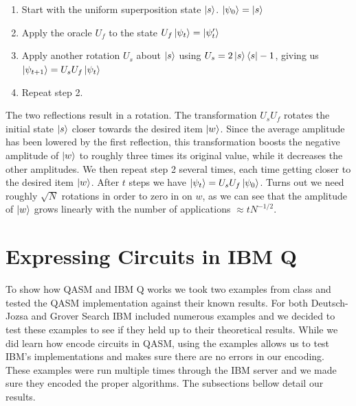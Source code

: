 \documentclass[12pt]{article}
\begin{document}
    \smallskip
    
    \begin{enumerate}
        \item  Start with the uniform superposition state $\ket{s}$. $\ket{\psi_0} = \ket{s}$
        \item Apply the oracle $U_f$ to the state $U_f \ket{\psi_t} = \ket{\psi_t'}$
        \item Apply another rotation $U_s$ about $\ket{s}$ using $U_s = 2\ket{s}\bra{s}-1$, giving us $\ket{\psi_{t+1}} = U_{s}U_{f}\ket{\psi_t}$
        \item Repeat step 2.
    \end{enumerate}
    \noindent
    The two reflections result in a rotation. The transformation $U_{s}U_f$ rotates the initial state $\ket{s}$ closer towards the desired item $\ket{w}$. Since the average amplitude has been lowered by the first reflection, this transformation boosts the negative amplitude of $\ket{w}$ to roughly three times its original value, while it decreases the other amplitudes. We then repeat step 2 several times, each time getting closer to the desired item $\ket{w}$. After $t$ steps we have $\ket{\psi_t} = U_{s}U_{f} \ket{\psi_0}$. Turns out we need roughly $\sqrt{N}$ rotations in order to zero in on $w$, as we can see that the amplitude of $\ket{w}$ grows linearly with the number of applications $\approx tN^{-1/2}$.
    
    
    
        
\section{Expressing Circuits in IBM Q}
    To show how QASM and IBM Q works we took two examples from class and tested the QASM implementation against their known results. For both Deutsch-Jozsa and Grover Search IBM included numerous examples and we decided to test these examples to see if they held up to their theoretical results. While we did learn how encode circuits in QASM, using the examples allows us to test IBM's implementations and makes sure there are no errors in our encoding. These examples were run multiple times through the IBM server and we made sure they encoded the proper algorithms. The subsections bellow detail our results.
    
\end{document}
